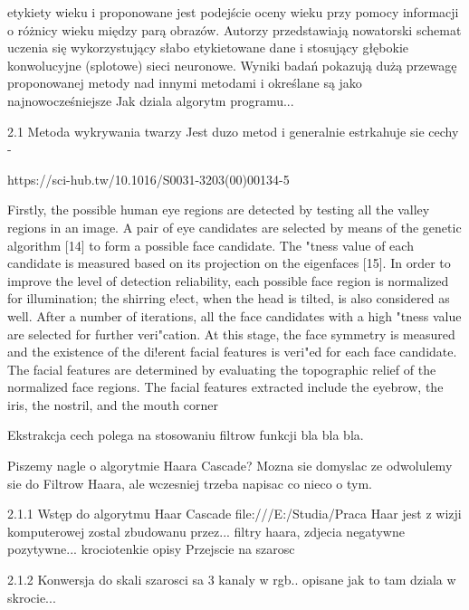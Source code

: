 etykiety wieku i proponowane jest podejście oceny wieku przy pomocy informacji o różnicy wieku między parą obrazów. Autorzy przedstawiają nowatorski schemat uczenia się wykorzystujący słabo etykietowane dane i stosujący głębokie konwolucyjne (splotowe) sieci neuronowe. Wyniki badań pokazują dużą przewagę proponowanej metody nad innymi metodami i określane są jako najnowocześniejsze
Jak dziala algorytm programu...

2.1 Metoda wykrywania twarzy
Jest duzo metod i generalnie estrkahuje sie cechy -

https://sci-hub.tw/10.1016/S0031-3203(00)00134-5

Firstly, the possible human eye regions are detected by
testing all the valley regions in an image. A pair of eye
candidates are selected by means of the genetic algorithm
[14] to form a possible face candidate. The "tness value
of each candidate is measured based on its projection on
the eigenfaces [15]. In order to improve the level of
detection reliability, each possible face region is normalized for illumination; the shirring e!ect, when the
head is tilted, is also considered as well. After a number of
iterations, all the face candidates with a high "tness value
are selected for further veri"cation. At this stage, the face
symmetry is measured and the existence of the di!erent
facial features is veri"ed for each face candidate. The
facial features are determined by evaluating the topographic relief of the normalized face regions. The facial
features extracted include the eyebrow, the iris, the
nostril, and the mouth corner


Ekstrakcja cech polega na stosowaniu filtrow funkcji bla bla bla.

Piszemy nagle o algorytmie Haara Cascade?
Mozna sie domyslac ze odwolulemy sie do Filtrow Haara, ale wczesniej trzeba napisac co nieco o tym.

2.1.1 Wstęp do algorytmu Haar Cascade
file:///E:/Studia/Praca%
Haar jest z wizji komputerowej zostal zbudowanu przez... filtry haara, zdjecia negatywne pozytywne...
krociotenkie opisy
Przejscie na szarosc %

2.1.2 Konwersja do skali szarosci
sa 3 kanaly w rgb.. opisane jak to tam dziala w skrocie...

